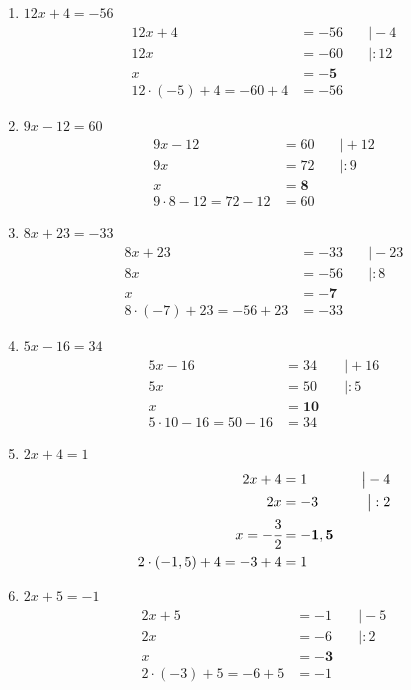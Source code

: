 \documentclass[a4paper,10pt]{article} %
\begin{document}
\begin{enumerate}[label=\alph*)]
  \item \(12x + 4 = -56\)
  \[
    \begin{aligned}
      12x + 4 &= -56 &\quad\big| - 4 \\
      12x &= -60 &\quad\big| : 12 \\
      x &= \mathbf{-5} \\
      12 \cdot (-5) + 4 = -60 + 4 &= -56
    \end{aligned}
  \]

  \item \(9x - 12 = 60\)
  \[
    \begin{aligned}
      9x - 12 &= 60 &\quad\big| + 12 \\
      9x &= 72 &\quad\big| : 9 \\
      x &= \mathbf{8} \\
      9 \cdot 8 - 12 = 72 - 12 &= 60
    \end{aligned}
  \]

  \item \(8x + 23 = -33\)
  \[
    \begin{aligned}
      8x + 23 &= -33 &\quad\big| - 23 \\
      8x &= -56 &\quad\big| : 8 \\
      x &= \mathbf{-7} \\
      8 \cdot (-7) + 23 = -56 + 23 &= -33
    \end{aligned}
  \]

  \item \(5x - 16 = 34\)
  \[
    \begin{aligned}
      5x - 16 &= 34 &\quad\big| + 16 \\
      5x &= 50 &\quad\big| : 5 \\
      x &= \mathbf{10} \\
      5 \cdot 10 - 16 = 50 - 16 &= 34
    \end{aligned}
  \]

  \item \(2x + 4 = 1\)
  \[
    \begin{aligned}
      2x + 4 &= 1 &\quad\big| - 4 \\
      2x &= -3 &\quad\big| : 2 \\
      x = -\cfrac{3}{2} &= \mathbf{-1,5} \\
      2 \cdot (-1,5) + 4 = -3 + 4 &= 1
    \end{aligned}
  \]

  \item \(2x + 5 = -1\)
  \[
    \begin{aligned}
      2x + 5 &= -1 &\quad\big| - 5 \\
      2x &= -6 &\quad\big| : 2 \\
      x &= \mathbf{-3} \\
      2 \cdot (-3) + 5 = -6 + 5 &= -1
    \end{aligned}
  \]


\end{enumerate}
\end{document}
